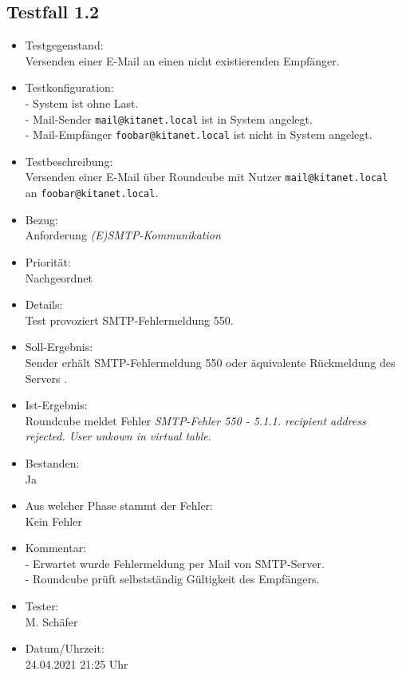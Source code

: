 \subsection{Testfall 1.2}
\begin{itemize}
	\item Testgegenstand:\\
	Versenden einer E-Mail an einen nicht existierenden Empfänger.
	\item Testkonfiguration:\\
	- System ist ohne Last.\\
	- Mail-Sender \verb+mail@kitanet.local+ ist in System angelegt.\\
	- Mail-Empfänger \verb+foobar@kitanet.local+ ist nicht in System angelegt.
	\item Testbeschreibung:\\
	Versenden einer E-Mail über Roundcube mit Nutzer \verb+mail@kitanet.local+ \\ an \verb+foobar@kitanet.local+.
	\item Bezug:\\
	Anforderung \textit{(E)SMTP-Kommunikation}
	\item Priorität:\\
	Nachgeordnet
	\item Details:\\
	Test provoziert SMTP-Fehlermeldung 550.
	\item Soll-Ergebnis:\\
	Sender erhält SMTP-Fehlermeldung 550 oder äquivalente Rückmeldung des Servers \citep[vgl.][16]{rfc821}.
	\item Ist-Ergebnis:\\
	Roundcube meldet Fehler \textit{SMTP-Fehler 550 - 5.1.1. recipient address rejected. User unkown in virtual table}.
	\item Bestanden:\\
	Ja
	\item Aus welcher Phase stammt der Fehler:\\
	Kein Fehler
	\item Kommentar:\\
	- Erwartet wurde Fehlermeldung per Mail von SMTP-Server.\\
	- Roundcube prüft selbstständig Gültigkeit des Empfängers.
	\item Tester:\\
	M. Schäfer
	\item Datum/Uhrzeit:\\
	24.04.2021 21:25 Uhr
\end{itemize}

